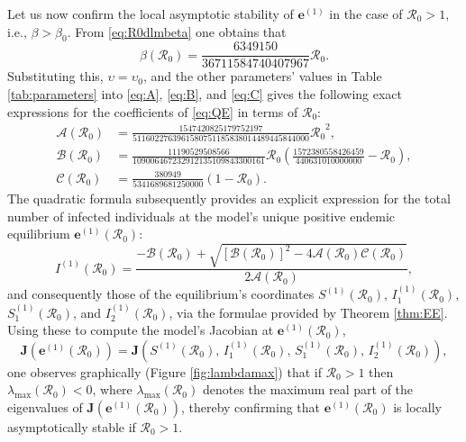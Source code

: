 \documentclass[11pt,reqno]{amsart}
\newcommand{\cR}{\mathcal{R}}
\begin{document}
Let us now confirm the local asymptotic stability of $\mathbf{e}^{(1)}$ in the case of $\cR_0>1$, i.e., $\beta>\beta_0$. From \eqref{eq:R0dlmbeta} one obtains that
\begin{equation}\label{eq:betadlmR0}
\beta\left(\mathcal{R}_0\right)=\frac{6349150}{36711584740407967}\cR_0.
\end{equation}
Substituting this, $\upsilon=\upsilon_0$, and the other parameters' values in Table \ref{tab:parameters} into \eqref{eq:A}, \eqref{eq:B}, and \eqref{eq:C} gives the following exact expressions for the coefficients of \eqref{eq:QE} in terms of $\cR_0$:
\begin{align*}
\mathcal{A}\left(\cR_0\right)&=\frac{1547420825179752197}{5116022763961580751185838014489445844000}{\cR_0}^2,\\
\mathcal{B}\left(\cR_0\right)&=\frac{11190529508566}{109006467232912135109843300161}\cR_0\left(\frac{1572380558426459}{440631010000000}-\cR_0\right),\\
\mathcal{C}\left(\cR_0\right)&=\frac{380949}{5341689681250000}\left(1-\cR_0\right).
\end{align*}
The quadratic formula subsequently provides an explicit expression for the total number of infected individuals at the model's unique positive endemic equilibrium $\mathbf{e}^{(1)}\left(\cR_0\right)$:
\begin{equation}\label{eq:endemicI}
I^{(1)}\left(\cR_0\right)=\frac{-\mathcal{B}\left(\cR_0\right)+\sqrt{\left[\mathcal{B}\left(\cR_0\right)\right]^2-4\mathcal{A}\left(\cR_0\right)\mathcal{C}\left(\cR_0\right)}}{2\mathcal{A}\left(\cR_0\right)},
\end{equation}
and consequently those of the equilibrium's coordinates $S^{(1)}\left(\cR_0\right)$, $I_1^{(1)}\left(\cR_0\right)$, $S_1^{(1)}\left(\cR_0\right)$, and $I_2^{(1)}\left(\cR_0\right)$, via the formulae provided by Theorem \ref{thm:EE}. Using these to compute the model's Jacobian at $\mathbf{e}^{(1)}\left(\cR_0\right)$,
$$\mathbf{J}\left(\mathbf{e}^{(1)}\left(\cR_0\right)\right)= \mathbf{J}\left(S^{(1)}\left(\cR_0\right),\,I_1^{(1)}\left(\cR_0\right),\,S_1^{(1)}\left(\cR_0\right),\,I_2^{(1)}\left(\cR_0\right)\right),$$
one observes graphically (Figure \ref{fig:lambdamax}) that if $\cR_0>1$ then $\lambda_{\max}\left(\cR_0\right)<0$, where $\lambda_{\max}\left(\cR_0\right)$ denotes the maximum real part of the eigenvalues of $\mathbf{J}\left(\mathbf{e}^{(1)}\left(\cR_0\right)\right)$, thereby confirming that $\mathbf{e}^{(1)}\left(\cR_0\right)$ is locally asymptotically stable if $\cR_0>1$.
\end{document}
